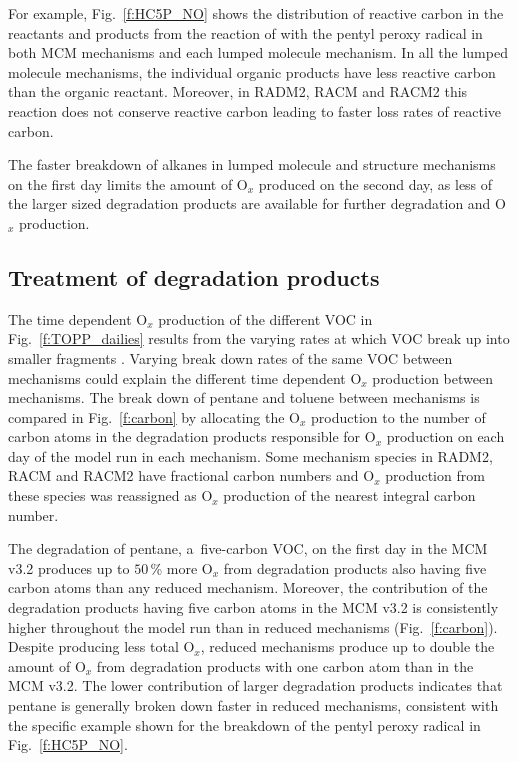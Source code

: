 \documentclass[acpd, online, hvmath]{copernicus}
\begin{document}
For example, Fig.~\ref{f:HC5P_NO} shows the distribution of reactive
carbon in the reactants and products from the reaction of 
with the pentyl peroxy radical in both MCM mechanisms and each lumped
molecule mechanism.  In all the lumped molecule mechanisms, the
individual organic products have less reactive carbon than the organic
reactant.  Moreover, in RADM2, RACM and RACM2 this reaction does not
conserve reactive carbon leading to faster loss rates of reactive
carbon.

The faster breakdown of alkanes in lumped molecule and structure
mechanisms on the first day limits the amount of O$_{x}$ produced
on the second day, as less of the larger sized degradation products
are available for further degradation and O$_{x}$ production.


\subsection{Treatment of degradation products}
\label{ss:products}

The time dependent O$_{x}$ production of the different VOC in
Fig.~\ref{f:TOPP_dailies} results from the varying rates at which VOC
break up into smaller fragments \citep{Butler:2011}.  Varying break
down rates of the same VOC between mechanisms could explain the
different time dependent O$_{x}$ production between mechanisms.
The break down of pentane and toluene between mechanisms is compared
in Fig.~\ref{f:carbon} by allocating the O$_{x}$ production to the
number of carbon atoms in the degradation products responsible for
O$_{x}$ production on each day of the model run in each mechanism.
Some mechanism species in RADM2, RACM and RACM2 have fractional carbon
numbers \citep{Stockwell:1990, Stockwell:1997, Goliff:2013} and
O$_{x}$ production from these species was reassigned as O$_{x}$
production of the nearest integral carbon number.

The degradation of pentane, a~five-carbon VOC, on the first day in the
MCM v3.2 produces up to $50$\,{\%} more O$_{x}$ from degradation
products also having five carbon atoms than any reduced mechanism.
Moreover, the contribution of the degradation products having five
carbon atoms in the MCM v3.2 is consistently higher throughout the
model run than in reduced mechanisms (Fig.~\ref{f:carbon}).  Despite
producing less total O$_{x}$, reduced mechanisms produce up to
double the amount of O$_{x}$ from degradation products with one
carbon atom than in the MCM v3.2.  The lower contribution of larger
degradation products indicates that pentane is generally broken down
faster in reduced mechanisms, consistent with the specific example
shown for the breakdown of the pentyl peroxy radical in
Fig.~\ref{f:HC5P_NO}.
\end{document}

